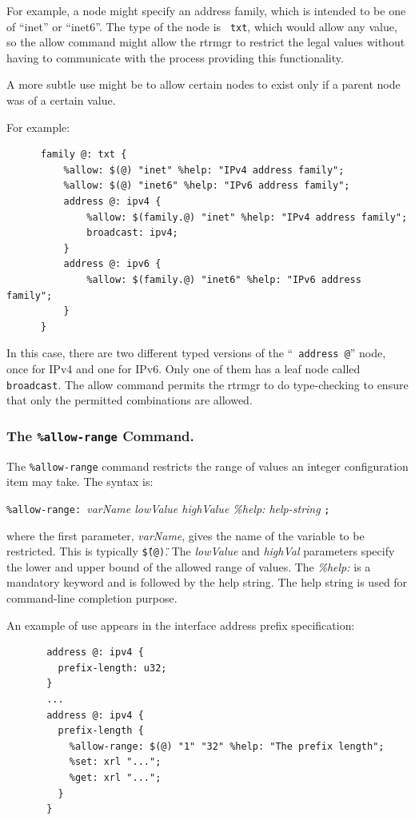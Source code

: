 \documentclass[11pt]{article}
\begin{document}
For example, a node might specify an address family, which is intended
to be one of ``inet'' or ``inet6''.  The type of the node is {\tt
txt}, which would allow any value, so the allow command might allow
the rtrmgr to restrict the legal values without having to
communicate with the process providing this functionality.

A more subtle use might be to allow certain nodes to exist only if a
parent node was of a certain value.

For example:

\begin{verbatim}
      family @: txt {
          %allow: $(@) "inet" %help: "IPv4 address family";
          %allow: $(@) "inet6" %help: "IPv6 address family";
          address @: ipv4 {
              %allow: $(family.@) "inet" %help: "IPv4 address family";
              broadcast: ipv4;
          }
          address @: ipv6 {
              %allow: $(family.@) "inet6" %help: "IPv6 address family";
          }
      }
\end{verbatim}

In this case, there are two different typed versions of the ``{\tt
address @}'' node, once for IPv4 and one for IPv6.  Only one of them has
a leaf node called {\tt broadcast}.  The allow command permits the
rtrmgr to do type-checking to ensure that only the permitted
combinations are allowed.

\subsubsection{The {\tt \%allow-range} Command.}

The {\tt \%allow-range} command restricts the range of values an
integer configuration item may take.  The syntax is:

\texttt{\%allow-range: }{\it varName lowValue highValue \%help: help-string} \texttt{;}

\noindent where the first parameter, \textit{varName}, gives the name
of the variable to be restricted.  This is typically
\texttt{\"\$(@)\"}.  The {\it lowValue} and {\it highVal} parameters
specify the lower and upper bound of the allowed range of values.
The {\it \%help:} is a mandatory keyword and is followed by the help
string. The help string is used for command-line completion purpose.

An example of use appears in the interface address prefix specification:

\begin{verbatim}
       address @: ipv4 {
         prefix-length: u32;
       }
       ...
       address @: ipv4 {
         prefix-length {
           %allow-range: $(@) "1" "32" %help: "The prefix length";
           %set: xrl "...";
           %get: xrl "...";
         }
       }
\end{verbatim}
\end{document}
